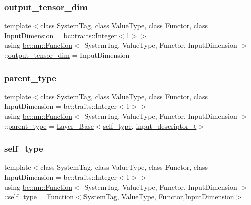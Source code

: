 \subsubsection{\texorpdfstring{output\+\_\+tensor\+\_\+dim}{output\_tensor\_dim}}
{\footnotesize\ttfamily template$<$class System\+Tag, class Value\+Type, class Functor, class Input\+Dimension = bc\+::traits\+::\+Integer$<$1$>$$>$ \\
using \hyperlink{structbc_1_1nn_1_1Function}{bc\+::nn\+::\+Function}$<$ System\+Tag, Value\+Type, Functor, Input\+Dimension $>$\+::\hyperlink{structbc_1_1nn_1_1Function_ab3450a09e41881b85f3f37112245b4f4}{output\+\_\+tensor\+\_\+dim} =  Input\+Dimension}

\mbox{\label{structbc_1_1nn_1_1Function_aac15eb912eb37278467558226f71fe65}} 
\subsubsection{\texorpdfstring{parent\+\_\+type}{parent\_type}}
{\footnotesize\ttfamily template$<$class System\+Tag, class Value\+Type, class Functor, class Input\+Dimension = bc\+::traits\+::\+Integer$<$1$>$$>$ \\
using \hyperlink{structbc_1_1nn_1_1Function}{bc\+::nn\+::\+Function}$<$ System\+Tag, Value\+Type, Functor, Input\+Dimension $>$\+::\hyperlink{structbc_1_1nn_1_1Function_aac15eb912eb37278467558226f71fe65}{parent\+\_\+type} =  \hyperlink{structbc_1_1nn_1_1Layer__Base}{Layer\+\_\+\+Base}$<$\hyperlink{structbc_1_1nn_1_1Function_adece619f4fd89384525c9a38bfbb6446}{self\+\_\+type}, \hyperlink{structbc_1_1nn_1_1Function_a4851b2a44e4e723b04bc0fa85b5230e7}{input\+\_\+descriptor\+\_\+t}$>$}

\mbox{\label{structbc_1_1nn_1_1Function_adece619f4fd89384525c9a38bfbb6446}} 
\subsubsection{\texorpdfstring{self\+\_\+type}{self\_type}}
{\footnotesize\ttfamily template$<$class System\+Tag, class Value\+Type, class Functor, class Input\+Dimension = bc\+::traits\+::\+Integer$<$1$>$$>$ \\
using \hyperlink{structbc_1_1nn_1_1Function}{bc\+::nn\+::\+Function}$<$ System\+Tag, Value\+Type, Functor, Input\+Dimension $>$\+::\hyperlink{structbc_1_1nn_1_1Function_adece619f4fd89384525c9a38bfbb6446}{self\+\_\+type} =  \hyperlink{structbc_1_1nn_1_1Function}{Function}$<$System\+Tag, Value\+Type, Functor,Input\+Dimension$>$}

